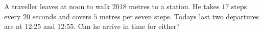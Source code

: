 A traveller leaves at noon to walk $2018$ metres to a station. He takes $17$ steps every $20$ seconds and covers $5$ metres per seven steps. Today\textquotesingle s last two departures are at 12:25 and 12:55. Can he arrive in time for either?
